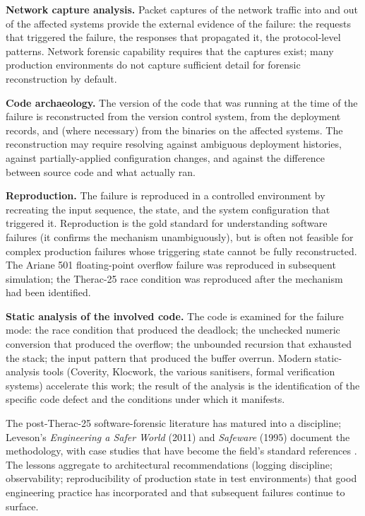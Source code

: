\textbf{Network capture analysis.} Packet captures of the network traffic into and out of the affected systems provide the external evidence of the failure: the requests that triggered the failure, the responses that propagated it, the protocol-level patterns. Network forensic capability requires that the captures exist; many production environments do not capture sufficient detail for forensic reconstruction by default.

\textbf{Code archaeology.} The version of the code that was running at the time of the failure is reconstructed from the version control system, from the deployment records, and (where necessary) from the binaries on the affected systems. The reconstruction may require resolving against ambiguous deployment histories, against partially-applied configuration changes, and against the difference between source code and what actually ran.

\textbf{Reproduction.} The failure is reproduced in a controlled environment by recreating the input sequence, the state, and the system configuration that triggered it. Reproduction is the gold standard for understanding software failures (it confirms the mechanism unambiguously), but is often not feasible for complex production failures whose triggering state cannot be fully reconstructed. The Ariane 501 floating-point overflow failure \cite{acc:ariane501-ifr} was reproduced in subsequent simulation; the Therac-25 race condition was reproduced after the mechanism had been identified.

\textbf{Static analysis of the involved code.} The code is examined for the failure mode: the race condition that produced the deadlock; the unchecked numeric conversion that produced the overflow; the unbounded recursion that exhausted the stack; the input pattern that produced the buffer overrun. Modern static-analysis tools (Coverity, Klocwork, the various sanitisers, formal verification systems) accelerate this work; the result of the analysis is the identification of the specific code defect and the conditions under which it manifests.

The post-Therac-25 software-forensic literature has matured into a discipline; Leveson's \emph{Engineering a Safer World} (2011) and \emph{Safeware} (1995) document the methodology, with case studies that have become the field's standard references \cite{text:leveson2011,text:leveson-safeware}. The lessons aggregate to architectural recommendations (logging discipline; observability; reproducibility of production state in test environments) that good engineering practice has incorporated and that subsequent failures continue to surface.


